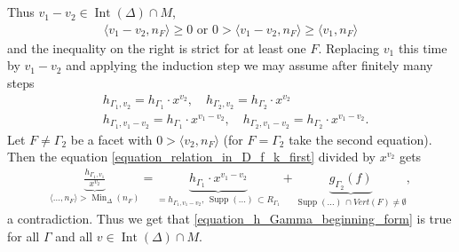 \documentclass[12pt, english]{article}
\DeclareMathOperator{\Int}{Int}
\DeclareMathOperator{\Min}{Min}
\DeclareMathOperator{\Supp}{Supp}
\begin{document}
\leavevmode
\\ \\
Thus $v_1-v_2 \in \Int(\Delta) \cap M$, 
\begin{align*}
	\langle v_1-v_2,n_F \rangle \geq 0 \textrm{ or } 0 > \langle v_1-v_2,n_F \rangle \geq \langle v_1,n_F \rangle
\end{align*}
and the inequality on the right is strict for at least one $F$. Replacing $v_1$ this time by $v_1-v_2$ and applying the induction step we may assume after finitely many steps
\begin{align*}
	& h_{\Gamma_1,v_2} = h_{\Gamma_1} \cdot x^{v_2}, \quad h_{\Gamma_2,v_2} = h_{\Gamma_2} \cdot x^{v_2} \\
	& h_{\Gamma_1,v_1-v_2} = h_{\Gamma_1} \cdot x^{v_1-v_2}, \quad h_{\Gamma_2,v_1-v_2} = h_{\Gamma_2} \cdot x^{v_1-v_2}.
\end{align*}
Let $F \neq \Gamma_2$ be a facet with $0 > \langle v_2,n_F \rangle$ (for $F=\Gamma_2$ take the second equation). Then the equation \ref{equation_relation_in_D_f_k_first} divided by $x^{v_2}$ gets
\begin{align*}
	\underbrace{\frac{h_{\Gamma_1,v_1}}{x^{v_2}}}_{\langle ...,n_F \rangle > \Min_{\Delta}(n_F)} = \underbrace{h_{\Gamma_1} \cdot x^{v_1-v_2}}_{=h_{\Gamma_1,v_1-v_2}, \, \Supp(...) \, \subset R_{\Gamma_1}} + \underbrace{g_{\Gamma_2}(f)}_{\Supp(...) \, \cap Vert(F) \neq \emptyset},
\end{align*}
a contradiction. Thus we get that \ref{equation_h_Gamma_beginning_form} is true for all $\Gamma$ and all $v \in \Int(\Delta) \cap M$.
\end{document}
